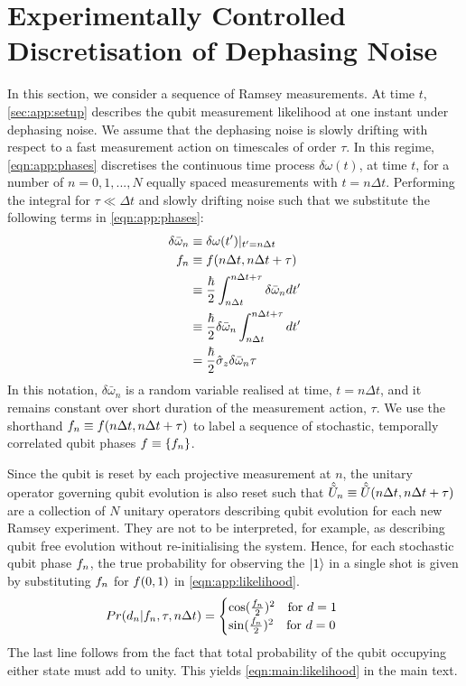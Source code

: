 \section{Experimentally Controlled Discretisation of Dephasing Noise \label{sec:app:exptres}} 
 In this section, we consider a sequence of Ramsey measurements. At time $t$, \cref{sec:app:setup} describes the qubit measurement likelihood at one instant under dephasing noise. We assume that the dephasing noise is slowly drifting with respect to a fast measurement action on timescales of order $\tau$. In this regime, \cref{eqn:app:phases} discretises the continuous time process $\delta\omega(t)$, at time $t$, for a number of $n= 0, 1, ..., N$ equally spaced measurements with $t = n \Delta t$. Performing the integral for $\tau \ll \Delta t$ and slowly drifting noise such that we substitute the following terms in \cref{eqn:app:phases}:
\begin{align}
\delta\bar{\omega}_n &\equiv \delta\omega(t')|_{t'=n \Delta t } \\
f_n &\equiv f(n\Delta t, n\Delta t + \tau) \\
& \equiv \frac{\hbar}{2}  \int_{n\Delta t}^{n\Delta t + \tau} \delta\bar{\omega}_n dt' \\
& \equiv \frac{\hbar}{2}  \delta\bar{\omega}_n \int_{n\Delta t}^{n\Delta t + \tau}  dt' \\
& = \frac{\hbar}{2}\hat{\sigma}_{z}\delta\bar{\omega}_n \tau \label{eqn:app:phases_constantdetuning}
\end{align}
In this notation, $\delta\bar{\omega}_n $ is a random variable realised at time, $t = n \Delta t$, and it remains constant over short duration of the measurement action, $\tau$.  We use the shorthand $f_n \equiv f(n\Delta t, n\Delta t + \tau)$ to label a sequence of stochastic, temporally correlated qubit phases $ f \equiv \{f_n \}$. 

Since the qubit is reset by each projective measurement at $n$, the unitary operator governing qubit evolution is also reset such that $\hat{\tilde{U}}_n \equiv \hat{\tilde{U}}(n\Delta t, n\Delta t + \tau)$ are a collection of $N$ unitary operators describing qubit evolution for each new Ramsey experiment. They are not to be interpreted, for example, as describing qubit free evolution without re-initialising the system. Hence, for each stochastic qubit phase $f_n$, the true probability for observing the $| 1 \rangle$ in a single shot is given by substituting $f_n $ for $ f(0,1)$ in \cref{eqn:app:likelihood}.
\begin{align}
Pr(d_n | f_n, \tau, n \Delta t) &= \begin{cases} \cos(\frac{f_{n}}{2})^2 \quad \text{for $d=1$} \\   \sin(\frac{f_{n}}{2})^2  \quad \text{for $ d=0$} \end{cases} 
\end{align}
The last line follows from the fact that total probability of the qubit occupying either state must add to unity. This yields \cref{eqn:main:likelihood} in the main text.

